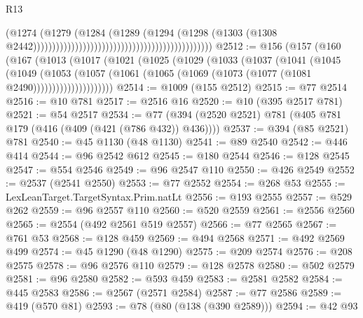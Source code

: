\begin{lexlean}{R13}
\begin{coremodule}
{{{{{{{{{{{{{{{{{{{{{{{{{{{{{{{{{{{{{{{{{{{{{{{{{{{{{{{{{{{{{{{{{{{{{{{{{{{{{{{{{{{{{{{{{{{{{{{{{{{{{{{{{{                                                                                  (@1274
                                                                                    (@1279
                                                                                      (@1284
                                                                                        (@1289
                                                                                          (@1294
                                                                                            (@1298
                                                                                              (@1303
                                                                                                (@1308
                                                                                                  @2442)))))))))))))))))))))))))))))))))))))))))))))))
@2512 := @156
    (@157
      (@160
        (@167
          (@1013
            (@1017
              (@1021
                (@1025
                  (@1029
                    (@1033
                      (@1037
                        (@1041
                          (@1045
                            (@1049
                              (@1053
                                (@1057
                                  (@1061
                                    (@1065 (@1069 (@1073 (@1077 (@1081 @2490)))))))))))))))))))))
@2514 := @1009 (@155 @2512)
@2515 := @77 @2514
@2516 := @10 @781
@2517 := @2516 @16
@2520 := @10 (@395 @2517 @781)
@2521 := @54 @2517
@2534 := @77 (@394 (@2520 @2521) @781 (@405 @781 @179 (@416 (@409 (@421 (@786 @432)) @436))))
@2537 := @394 (@85 @2521) @781
@2540 := @45 @1130 (@48 @1130)
@2541 := @89 @2540
@2542 := @446 @414
@2544 := @96 @2542 @612
@2545 := @180 @2544
@2546 := @128 @2545
@2547 := @554 @2546
@2549 := @96 @2547 @110
@2550 := @426 @2549
@2552 := @2537 (@2541 @2550)
@2553 := @77 @2552
@2554 := @268 @53
@2555 := LexLeanTarget.TargetSyntax.Prim.natLt
@2556 := @193 @2555
@2557 := @529 @262
@2559 := @96 @2557 @110
@2560 := @520 @2559
@2561 := @2556 @2560
@2565 := @2554 (@492 @2561 @519 @2557)
@2566 := @77 @2565
@2567 := @761 @53
@2568 := @128 @459
@2569 := @494 @2568
@2571 := @492 @2569 @499
@2574 := @45 @1290 (@48 @1290)
@2575 := @209 @2574
@2576 := @208 @2575
@2578 := @96 @2576 @110
@2579 := @128 @2578
@2580 := @502 @2579
@2581 := @96 @2580
@2582 := @593 @459
@2583 := @2581 @2582
@2584 := @445 @2583
@2586 := @2567 (@2571 @2584)
@2587 := @77 @2586
@2589 := @419 (@570 @81)
@2593 := @78 (@80 (@138 (@390 @2589)))
@2594 := @42 @93
}}}}}}}}}}}}}}}}}}}}}}}}}}}}}}}}}}}}}}}}}}}}}}}}}}}}}}}}}}}}}}}}}}}}}}}}}}}}}}}}}}}}}}}}}}}}}}}}}}}}}}}}}}
\end{coremodule}
\end{lexlean}
